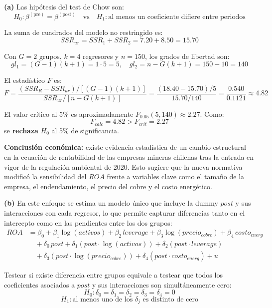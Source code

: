 \documentclass[10pt,a4paper]{article}
\begin{document}
\begin{enumerate}
\begin{enumerate}
\textbf{(a)} Las hipótesis del test de Chow son:
\[
H_0: \beta^{(\text{pre})} = \beta^{(\text{post})} \quad \text{vs} \quad H_1: \text{al menos un coeficiente difiere entre periodos}
\]

La suma de cuadrados del modelo no restringido es:
\[
SSR_{ur} = SSR_1 + SSR_2 = 7.20 + 8.50 = 15.70
\]

Con $G = 2$ grupos, $k = 4$ regresores y $n = 150$, los grados de libertad son:
\[
gl_1 = (G-1)(k+1) = 1 \cdot 5 = 5, \quad gl_2 = n - G(k+1) = 150 - 10 = 140
\]

El estadístico $F$ es:
\[
F = \frac{(SSR_R - SSR_{ur}) / [(G-1)(k+1)]}{SSR_{ur} / [n - G(k+1)]} = \frac{(18.40 - 15.70)/5}{15.70/140} = \frac{0.540}{0.1121} \approx 4.82
\]

El valor crítico al 5\% es aproximadamente $F_{0.05}(5, 140) \approx 2.27$. Como:
\[
F_{calc} = 4.82 > F_{crit} = 2.27
\]
se \textbf{rechaza} $H_0$ al 5\% de significancia.

\textbf{Conclusión económica:} existe evidencia estadística de un cambio estructural en la ecuación de rentabilidad de las empresas mineras chilenas tras la entrada en vigor de la regulación ambiental de 2020. Esto sugiere que la nueva normativa modificó la sensibilidad del $ROA$ frente a variables clave como el tamaño de la empresa, el endeudamiento, el precio del cobre y el costo energético.

\medskip

\textbf{(b)} En este enfoque se estima un modelo único que incluye la dummy $post$ y sus interacciones con cada regresor, lo que permite capturar diferencias tanto en el intercepto como en las pendientes entre los dos grupos:
\begin{align*}
ROA &= \beta_0 + \beta_1 \log(activos) + \beta_2 \, leverage + \beta_3 \log(precio_{cobre}) + \beta_4 \, costo_{energ} \\
&\quad + \delta_0 \, post + \delta_1 (post \cdot \log(activos)) + \delta_2 (post \cdot leverage) \\
&\quad + \delta_3 (post \cdot \log(precio_{cobre})) + \delta_4 (post \cdot costo_{energ}) + u
\end{align*}

Testear si existe diferencia entre grupos equivale a testear que todos los coeficientes asociados a $post$ y sus interacciones son simultáneamente cero:
\[
H_0: \delta_0 = \delta_1 = \delta_2 = \delta_3 = \delta_4 = 0
\]
\[
H_1: \text{al menos uno de los } \delta_j \text{ es distinto de cero}
\]


\end{enumerate}
\end{enumerate}
\end{document}
